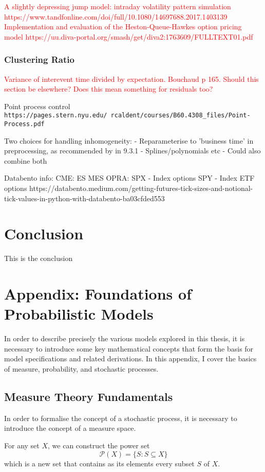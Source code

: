 \documentclass[honours,12pt]{unswthesis}
\numberwithin{equation}{section}
\begin{document}
\textcolor{red}{A slightly depressing jump model: intraday volatility pattern simulation https://www.tandfonline.com/doi/full/10.1080/14697688.2017.1403139}
\textcolor{red}{Implementation and evaluation of the Heston-Queue-Hawkes option pricing model https://uu.diva-portal.org/smash/get/diva2:1763609/FULLTEXT01.pdf}

\subsection{Clustering Ratio}
\textcolor{red}{Variance of interevent time divided by expectation. Bouchaud p 165. Should this section be elsewhere? Does this mean something for residuals too?}

Point process control \texttt{https://pages.stern.nyu.edu/~rcaldent/courses/B60.4308_files/Point-Process.pdf}

Two choices for handling inhomogeneity:
- Reparameterise to 'business time' in preprocessing, as recommended by \cite{BouchaudEtAl} in 9.3.1
- Splines/polynomials etc
- Could also combine both


Databento info:
CME:
ES
MES
OPRA:
SPX - Index options
SPY - Index ETF options
https://databento.medium.com/getting-futures-tick-sizes-and-notional-tick-values-in-python-with-databento-ba03cfded553

\chapter{Conclusion}\label{ccl}


This is the conclusion


\chapter{Appendix: Foundations of Probabilistic Models}
In order to describe precisely the various models explored in this thesis, it is necessary to introduce some key mathematical concepts that form the basis for model specifications and related derivations. In this appendix, I cover the basics of measure, probability, and stochastic processes.

\section{Measure Theory Fundamentals}
In order to formalise the concept of a stochastic process, it is necessary to introduce the concept of a measure space.

For any set $X$, we can construct the power set
$$\mathcal{P}(X) = \{S : S\subseteq X\}$$
which is a new set that contains as its elements every subset $S$ of $X$.
\end{document}
